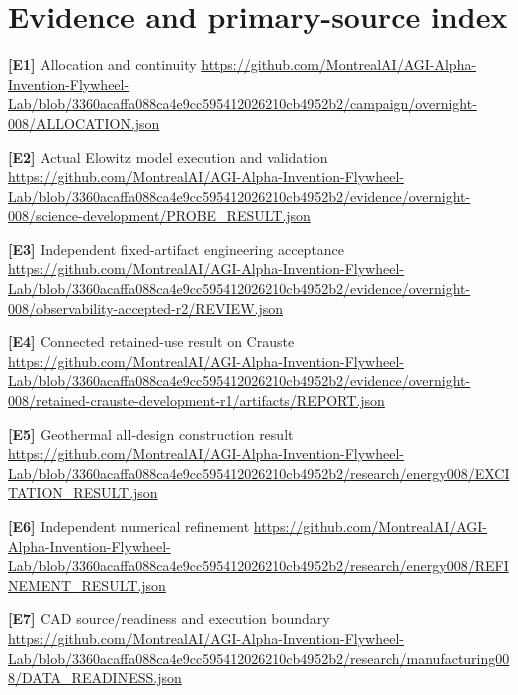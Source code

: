 \documentclass[11pt,letterpaper]{article}
\begin{document}
\section{Evidence and primary-source index}
\begin{samepage}
\small\textbf{[E1]} Allocation and continuity \url{https://github.com/MontrealAI/AGI-Alpha-Invention-Flywheel-Lab/blob/3360acaffa088ca4e9cc595412026210cb4952b2/campaign/overnight-008/ALLOCATION.json}\par
\normalsize
\end{samepage}
\begin{samepage}
\small\textbf{[E2]} Actual Elowitz model execution and validation \url{https://github.com/MontrealAI/AGI-Alpha-Invention-Flywheel-Lab/blob/3360acaffa088ca4e9cc595412026210cb4952b2/evidence/overnight-008/science-development/PROBE_RESULT.json}\par
\normalsize
\end{samepage}
\begin{samepage}
\small\textbf{[E3]} Independent fixed-artifact engineering acceptance \url{https://github.com/MontrealAI/AGI-Alpha-Invention-Flywheel-Lab/blob/3360acaffa088ca4e9cc595412026210cb4952b2/evidence/overnight-008/observability-accepted-r2/REVIEW.json}\par
\normalsize
\end{samepage}
\begin{samepage}
\small\textbf{[E4]} Connected retained-use result on Crauste \url{https://github.com/MontrealAI/AGI-Alpha-Invention-Flywheel-Lab/blob/3360acaffa088ca4e9cc595412026210cb4952b2/evidence/overnight-008/retained-crauste-development-r1/artifacts/REPORT.json}\par
\normalsize
\end{samepage}
\begin{samepage}
\small\textbf{[E5]} Geothermal all-design construction result \url{https://github.com/MontrealAI/AGI-Alpha-Invention-Flywheel-Lab/blob/3360acaffa088ca4e9cc595412026210cb4952b2/research/energy008/EXCITATION_RESULT.json}\par
\normalsize
\end{samepage}
\begin{samepage}
\small\textbf{[E6]} Independent numerical refinement \url{https://github.com/MontrealAI/AGI-Alpha-Invention-Flywheel-Lab/blob/3360acaffa088ca4e9cc595412026210cb4952b2/research/energy008/REFINEMENT_RESULT.json}\par
\normalsize
\end{samepage}
\begin{samepage}
\small\textbf{[E7]} CAD source/readiness and execution boundary \url{https://github.com/MontrealAI/AGI-Alpha-Invention-Flywheel-Lab/blob/3360acaffa088ca4e9cc595412026210cb4952b2/research/manufacturing008/DATA_READINESS.json}\par
\normalsize
\end{samepage}
\end{document}

